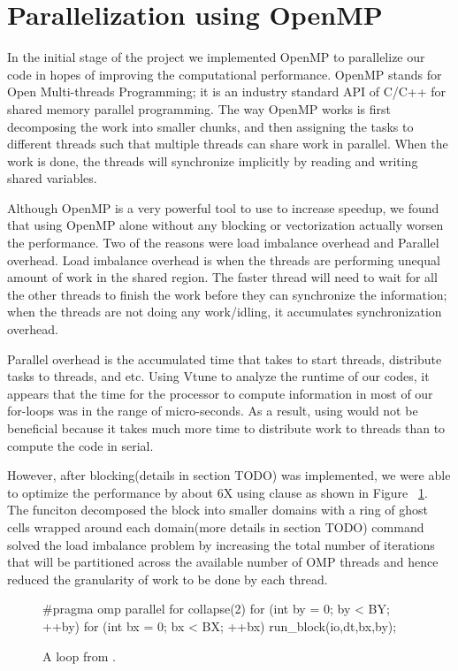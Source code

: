 \section{Parallelization using OpenMP}\label{sec:parallelization}

In the initial stage of the project we implemented OpenMP to parallelize our
code in hopes of improving the computational performance. OpenMP stands for
Open Multi-threads Programming; it is an industry standard API of C/C++ for
shared memory parallel programming.  The way OpenMP works is first decomposing
the work into smaller chunks, and then assigning the tasks to different threads
such that multiple threads can share work in parallel. When the work is done,
the threads will synchronize implicitly by reading and writing shared
variables.

Although OpenMP is a very powerful tool to use to increase speedup, we found
that using OpenMP alone without any blocking or vectorization actually worsen
the performance. Two of the reasons were load imbalance overhead and Parallel
overhead. Load imbalance overhead is when the threads are performing unequal
amount of work in the shared region. The faster thread will need to wait for
all the other threads to finish the work before they can synchronize the
information; when the threads are not doing any work/idling, it accumulates
synchronization overhead.

Parallel overhead is the accumulated time that takes to start threads,
distribute tasks to threads, and etc. Using Vtune to analyze the runtime of our
codes, it appears that the time for the processor to compute information in
most of our for-loops was in the range of micro-seconds. As a result, using
 would not be beneficial because it takes much
more time to distribute work to threads than to compute the code in serial.

However, after blocking(details in section TODO) was implemented, we were able
to optimize the performance by about 6X using  clause as shown in Figure ~\ref{fig:omp}. The 
funciton decomposed the block into smaller domains with a ring of ghost cells
wrapped around each domain(more details in section TODO)  command solved the load imbalance problem by
increasing the total number of iterations that will be partitioned across the
available number of OMP threads and hence reduced the granularity of work to be
done by each thread.

\begin{figure}[h]
\centering
\begin{CPP}[firstnumber=476]
 #pragma omp parallel for collapse(2)
      for (int by = 0; by < BY; ++by) {
         for (int bx = 0; bx < BX; ++bx) {
              run_block(io,dt,bx,by);
                 }
           }
\end{CPP}
\caption{A loop from .}
\label{fig:omp}
\end{figure}
